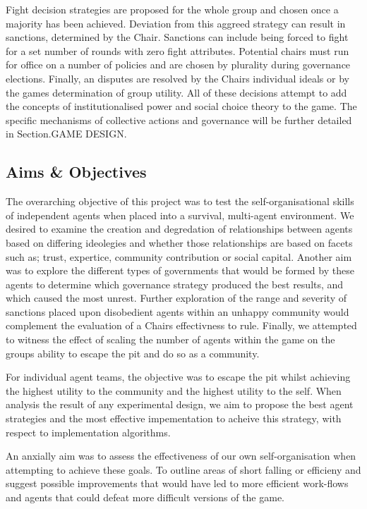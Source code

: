 Fight decision strategies are proposed for the whole group and chosen once a majority has been achieved. Deviation from this aggreed strategy can result in sanctions, determined by the Chair. Sanctions can include being forced to fight for a set number of rounds with zero fight attributes. Potential chairs must run for office on a number of policies and are chosen by plurality during governance elections. Finally, an disputes are resolved by the Chairs individual ideals or by the games determination of group utility. All of these decisions attempt to add the concepts of institutionalised power and social choice theory to the game. The specific mechanisms of collective actions and governance will be further detailed in Section.GAME DESIGN.


\subsection{Aims \& Objectives}\label{sec:aims}

The overarching objective of this project was to test the self-organisational skills of independent agents when placed into a survival, multi-agent environment. We desired to examine the creation and degredation of relationships between agents based on differing ideolegies and whether those relationships are based on facets such as; trust, expertice, community contribution or social capital. Another aim was to explore the different types of governments that would be formed by these agents to determine which governance strategy produced the best results, and which caused the most unrest. Further exploration of the range and severity of sanctions placed upon disobedient agents within an unhappy community would complement the evaluation of a Chairs effectivness to rule. Finally, we attempted to witness the effect of scaling the number of agents within the game on the groups ability to escape the pit and do so as a community. 

For individual agent teams, the objective was to escape the pit whilst achieving the highest utility to the community and the highest utility to the self. When analysis the result of any experimental design, we aim to propose the best agent strategies and the most effective impementation to acheive this strategy, with respect to implementation algorithms. 

An anxially aim was to assess the effectiveness of our own self-organisation when attempting to achieve these goals. To outline areas of short falling or efficieny and suggest possible improvements that would have led to more efficient work-flows and agents that could defeat more difficult versions of the game. 

